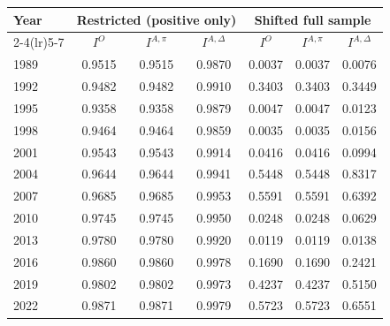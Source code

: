 \begin{tabular}{lcccccc}
\toprule
Year & \multicolumn{3}{c}{Restricted (positive only)} & \multicolumn{3}{c}{Shifted full sample} \\
\cmidrule(lr){2-4}\cmidrule(lr){5-7}
& $I^{O}$ & $I^{A,\pi}$ & $I^{A,\Delta}$ & $I^{O}$ & $I^{A,\pi}$ & $I^{A,\Delta}$ \\
\midrule
1989 & 0.9515 & 0.9515 & 0.9870 & 0.0037 & 0.0037 & 0.0076 \\
1992 & 0.9482 & 0.9482 & 0.9910 & 0.3403 & 0.3403 & 0.3449 \\
1995 & 0.9358 & 0.9358 & 0.9879 & 0.0047 & 0.0047 & 0.0123 \\
1998 & 0.9464 & 0.9464 & 0.9859 & 0.0035 & 0.0035 & 0.0156 \\
2001 & 0.9543 & 0.9543 & 0.9914 & 0.0416 & 0.0416 & 0.0994 \\
2004 & 0.9644 & 0.9644 & 0.9941 & 0.5448 & 0.5448 & 0.8317 \\
2007 & 0.9685 & 0.9685 & 0.9953 & 0.5591 & 0.5591 & 0.6392 \\
2010 & 0.9745 & 0.9745 & 0.9950 & 0.0248 & 0.0248 & 0.0629 \\
2013 & 0.9780 & 0.9780 & 0.9920 & 0.0119 & 0.0119 & 0.0138 \\
2016 & 0.9860 & 0.9860 & 0.9978 & 0.1690 & 0.1690 & 0.2421 \\
2019 & 0.9802 & 0.9802 & 0.9973 & 0.4237 & 0.4237 & 0.5150 \\
2022 & 0.9871 & 0.9871 & 0.9979 & 0.5723 & 0.5723 & 0.6551 \\
\bottomrule
\end{tabular}

